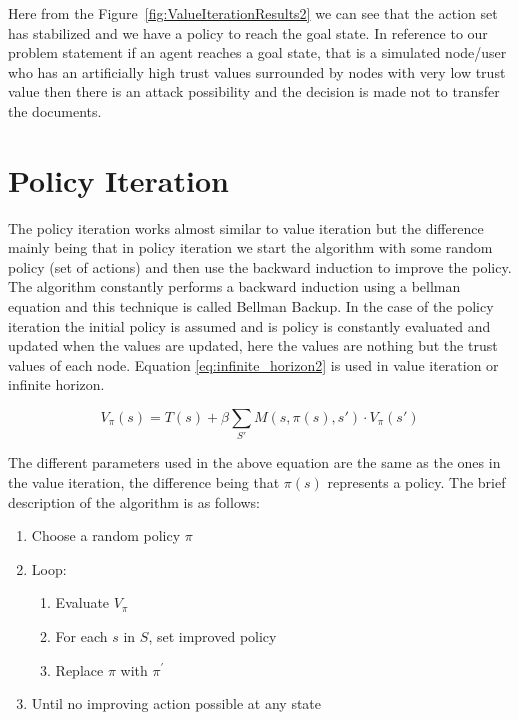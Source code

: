 Here from the Figure~\ref{fig:ValueIterationResults2} we can see that the action set has stabilized and we
have a policy to reach the goal state. In reference to our problem statement if
an agent reaches a goal state, that is a simulated node/user who has an
artificially high trust values surrounded by nodes with very low trust value
then there is an attack possibility and the decision is made not to transfer the
documents.

\section{Policy Iteration}

The policy iteration works almost similar to value iteration but the difference
mainly being that in policy iteration we start the algorithm with some random
policy (set of actions) and then use the backward induction to improve the
policy. The algorithm constantly performs a backward induction using a bellman
equation \autocite{Wikipedia2013} and this technique is called Bellman Backup. In the case of the
policy iteration the initial policy is assumed and is policy is constantly
evaluated and updated when the values are updated, here the values are nothing
but the trust values of each node.  Equation \ref{eq:infinite_horizon2} is used in value iteration
or infinite horizon.

\begin{equation} 
    \label{eq:infinite_horizon2}
    V_\pi(s) = T(s) + \beta \sum_{S'} M(s,\pi(s),s') \cdot V_\pi(s')
\end{equation}


The different parameters used in the above equation are the same as the ones in
the value iteration, the difference being that $\pi(s)$ represents a policy. The brief
description of the algorithm is as follows:
\begin{enumerate}
    \item Choose a random policy $\pi$
    \item Loop: 
        \begin{enumerate}
            \item Evaluate $V_\pi$ 
            \item For each $s$ in $S$, set improved policy
            \item Replace $\pi$ with $\pi^\prime$ 
        \end{enumerate}
        \item Until no improving action possible at any state
\end{enumerate}

